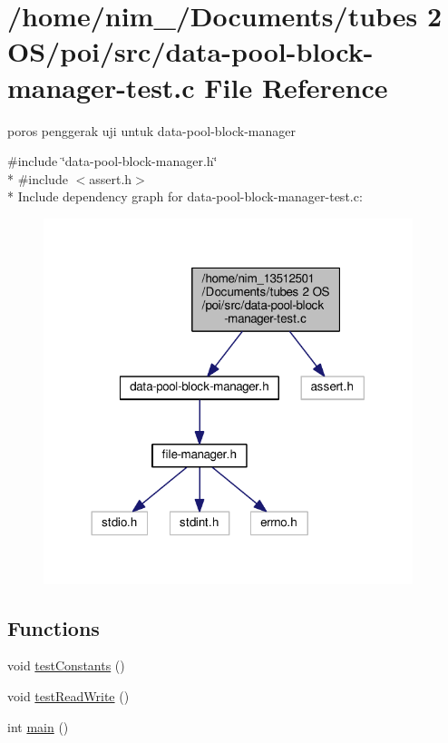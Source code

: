 \hypertarget{data-pool-block-manager-test_8c}{\section{/home/nim\-\_/\-Documents/tubes 2 O\-S/poi/src/data-\/pool-\/block-\/manager-\/test.c File Reference}
\label{data-pool-block-manager-test_8c}
}


poros penggerak uji untuk data-\/pool-\/block-\/manager  


{\ttfamily \#include \char`\"{}data-\/pool-\/block-\/manager.\-h\char`\"{}}\\*
{\ttfamily \#include $<$assert.\-h$>$}\\*
Include dependency graph for data-\/pool-\/block-\/manager-\/test.c\-:\nopagebreak
\begin{figure}[H]
\begin{center}
\leavevmode
\includegraphics[width=305pt]{data-pool-block-manager-test_8c__incl}
\end{center}
\end{figure}
\subsection*{Functions}
\begin{DoxyCompactItemize}
\item 
void \hyperlink{data-pool-block-manager-test_8c_ae85954364eb34c20aec506171ba5f351}{test\-Constants} ()
\item 
void \hyperlink{data-pool-block-manager-test_8c_a75323f97b259a6284370855087fb48ff}{test\-Read\-Write} ()
\item 
int \hyperlink{data-pool-block-manager-test_8c_ae66f6b31b5ad750f1fe042a706a4e3d4}{main} ()
\end{DoxyCompactItemize}



